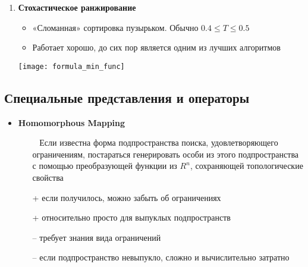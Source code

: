\begin{enumerate}
\begin{itemize}
    \end{itemize}

    \item \textbf{Стохастическое ранжирование}
    \begin{itemize}
        \item «Сломанная» сортировка пузырьком. Обычно $0.4 \leq T \leq 0.5$
        \item Работает хорошо, до сих пор является одним из лучших алгоритмов
    \end{itemize}
    \texttt{[image: formula\_min\_func]}

\end{enumerate}

\subsection{Специальные представления и операторы}
\begin{itemize}
    \item \textbf{Homomorphous Mapping}
    \begin{itemize}
        \item [~] Если известна форма подпространства поиска, удовлетворяющего ограничениям, постараться генерировать особи из этого подпространства с помощью преобразующей функции из $R^n$, сохраняющей топологические свойства
        \item [+] если получилось, можно забыть об ограничениях
        \item [+] относительно просто для выпуклых подпространств
        \item [--] требует знания вида ограничений
        \item [--] если подпространство невыпукло, сложно и вычислительно затратно

    \end{itemize}
\end{itemize}

